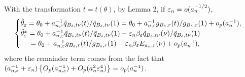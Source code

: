 \documentclass[9pt]{article}
\theoremstyle{remark}
\begin{document}
	With the transformation $t=t(\theta)$, by Lemma 2, if $\varepsilon_{n}=o(a_{n}^{-1/2})$,
	\begin{eqnarray}
	\begin{cases}
	\tilde{\theta}_{\varepsilon}=\theta_{0}+a_{n,\varepsilon}^{-1}\tilde{q}_{B_{\delta},t\nu}(t)/\tilde{q}_{B_{\delta},t\nu}(1)=\theta_{0}+a_{n,\varepsilon}^{-1}g_{B_{\delta},r}(t)/g_{B_{\delta},r}(1)+o_{p}(a_{n}^{-1}),\\
	\tilde{\theta}_{\varepsilon}^{x}=\theta_{0}+a_{n,\varepsilon}^{-1}\tilde{q}_{B_{\delta},t\nu}(t)/\tilde{q}_{B_{\delta},t\nu}(1)-\varepsilon_{n}\beta_{\varepsilon}\tilde{q}_{B_{\delta},t\nu}(\nu)/\tilde{q}_{B_{\delta},t\nu}(1)\\
	\hspace{5mm} =\theta_{0}+a_{n,\varepsilon}^{-1}g_{B_{\delta},r}(t)/g_{B_{\delta},r}(1)-\varepsilon_{n}\beta_{\varepsilon}E_{a_{n},r}(\nu)+o_{p}(a_{n}^{-1}),
	\end{cases}\label{eq4}
	\end{eqnarray}
	where the remainder term comes from the fact that $(a_{n,\varepsilon}^{-1}+\varepsilon_{n})\left\{ O_{p}(a_{n,\varepsilon}^{-1})+O_{p}(a_{n}^{2}\varepsilon_{n}^{4})\right\} =o_{p}(a_{n}^{-1})$.
	
\end{document}
